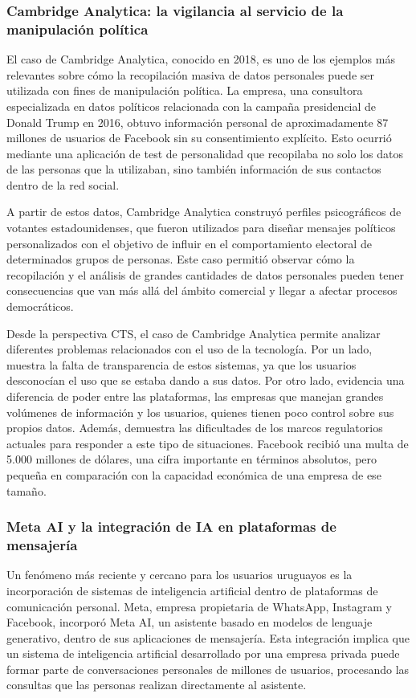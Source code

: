 \documentclass[11pt,a4paper]{article}
\begin{document}
\subsubsection{Cambridge Analytica: la vigilancia al servicio de la manipulación política}

El caso de Cambridge Analytica, conocido en 2018, es uno de los ejemplos más relevantes sobre cómo la recopilación masiva de datos personales puede ser utilizada con fines de manipulación política. La empresa, una consultora especializada en datos políticos relacionada con la campaña presidencial de Donald Trump en 2016, obtuvo información personal de aproximadamente 87 millones de usuarios de Facebook sin su consentimiento explícito. Esto ocurrió mediante una aplicación de test de personalidad que recopilaba no solo los datos de las personas que la utilizaban, sino también información de sus contactos dentro de la red social.

A partir de estos datos, Cambridge Analytica construyó perfiles psicográficos de votantes estadounidenses, que fueron utilizados para diseñar mensajes políticos personalizados con el objetivo de influir en el comportamiento electoral de determinados grupos de personas. Este caso permitió observar cómo la recopilación y el análisis de grandes cantidades de datos personales pueden tener consecuencias que van más allá del ámbito comercial y llegar a afectar procesos democráticos.

Desde la perspectiva CTS, el caso de Cambridge Analytica permite analizar diferentes problemas relacionados con el uso de la tecnología. Por un lado, muestra la falta de transparencia de estos sistemas, ya que los usuarios desconocían el uso que se estaba dando a sus datos. Por otro lado, evidencia una diferencia de poder entre las plataformas, las empresas que manejan grandes volúmenes de información y los usuarios, quienes tienen poco control sobre sus propios datos. Además, demuestra las dificultades de los marcos regulatorios actuales para responder a este tipo de situaciones. Facebook recibió una multa de 5.000 millones de dólares, una cifra importante en términos absolutos, pero pequeña en comparación con la capacidad económica de una empresa de ese tamaño.

\subsubsection{Meta AI y la integración de IA en plataformas de mensajería}

Un fenómeno más reciente y cercano para los usuarios uruguayos es la incorporación de sistemas de inteligencia artificial dentro de plataformas de comunicación personal. Meta, empresa propietaria de WhatsApp, Instagram y Facebook, incorporó Meta AI, un asistente basado en modelos de lenguaje generativo, dentro de sus aplicaciones de mensajería. Esta integración implica que un sistema de inteligencia artificial desarrollado por una empresa privada puede formar parte de conversaciones personales de millones de usuarios, procesando las consultas que las personas realizan directamente al asistente.
\end{document}
